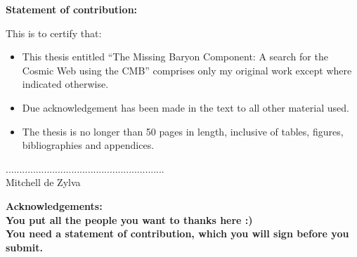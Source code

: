 


\bfseries{Statement of contribution:}\mdseries\\
\vspace{1.0cm}

This is to certify that:\\

\begin{itemize}

\item This thesis entitled ``The Missing Baryon Component: A search for the Cosmic Web using the CMB'' comprises only my original work except where indicated otherwise.

\item Due acknowledgement has been made in the text to all other material used.

\item The thesis is no longer than 50 pages in length, inclusive of tables, figures, bibliographies and
appendices.

\end{itemize}

\vspace{4.0cm}


\scriptsize{..........................................................}\normalsize\\
\newline
\vspace{3.0cm}
\indent Mitchell de Zylva\\
      					 
\vspace{2.0cm}

\bfseries{Acknowledgements:}\mdseries\\

You put all the people you want to thanks here :)\\

You need a statement of contribution, which you will sign before you submit. 